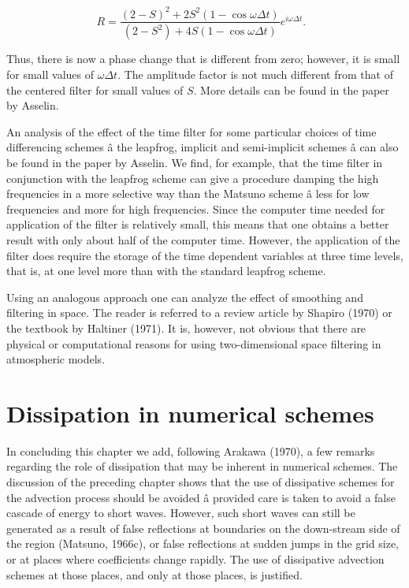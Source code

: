 \[R = \frac{( 2 - S )^{2} + 2S^{2}\left( 1 - \cos{\omega\Delta t} \right)}{( 2 - S^{2} ) + 4S\left( 1 - \cos{\omega\Delta t} \right)}e^{i\omega\Delta t}.\text{        }\]

Thus, there is now a phase change that is different from zero; however,
it is small for small values of \(\omega\Delta t\). The amplitude factor
is not much different from that of the centered filter for small values
of \(S\). More details can be found in the paper by Asselin.

An analysis of the effect of the time filter for some particular choices
of time differencing schemes â the leapfrog, implicit and semi-implicit
schemes â can also be found in the paper by Asselin. We find, for
example, that the time filter in conjunction with the leapfrog scheme
can give a procedure damping the high frequencies in a more selective
way than the Matsuno scheme â less for low frequencies and more for high
frequencies. Since the computer time needed for application of the
filter is relatively small, this means that one obtains a better result
with only about half of the computer time. However, the application of
the filter does require the storage of the time dependent variables at
three time levels, that is, at one level more than with the standard
leapfrog scheme.

Using an analogous approach one can analyze the effect of smoothing and
filtering in space. The reader is referred to a review article by
Shapiro (1970) or the textbook by Haltiner (1971). It is, however, not
obvious that there are physical or computational reasons for using
two-dimensional space filtering in atmospheric models.

\section{Dissipation in numerical
schemes}\label{sec:dissipation-in-numerical-schemes}

In concluding this chapter we add, following Arakawa (1970), a few
remarks regarding the role of dissipation that may be inherent in
numerical schemes. The discussion of the preceding chapter shows that
the use of dissipative schemes for the advection process should be
avoided â provided care is taken to avoid a false cascade of energy to
short waves. However, such short waves can still be generated as a
result of false reflections at boundaries on the down-stream side of the
region (Matsuno, 1966c), or false reflections at sudden jumps in the
grid size, or at places where coefficients change rapidly. The use of
dissipative advection schemes at those places, and only at those places,
is justified.

